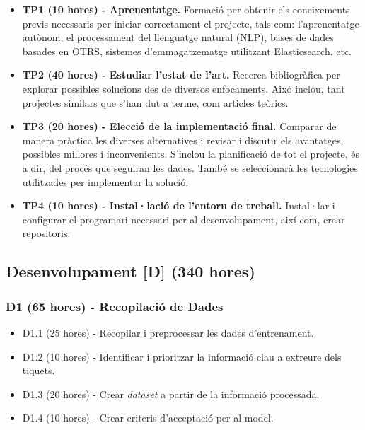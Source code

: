 \begin{itemize}
    \item \textbf{TP1 (10 hores) - Aprenentatge.}
        Formació per obtenir els coneixements previs necessaris per iniciar correctament el projecte, tals com: l'aprenentatge autònom, el processament del llenguatge natural (NLP), bases de dades basades en OTRS, sistemes d'emmagatzematge utilitzant Elasticsearch, etc.
    
    \item \textbf{TP2 (40 hores) - Estudiar l'estat de l'art.}
        Recerca bibliogràfica per explorar possibles solucions des de diversos enfocaments. Això inclou, tant projectes similars que s'han dut a terme, com articles teòrics.
    
    \item \textbf{TP3 (20 hores) - Elecció de la implementació final.}
        Comparar de manera pràctica les diverses alternatives i revisar i discutir els avantatges, possibles millores i inconvenients. S'inclou la planificació de tot el projecte, és a dir, del procés que seguiran les dades. També se seleccionarà les tecnologies utilitzades per implementar la solució.
        
    \item \textbf{TP4 (10 hores) - Instal·lació de l'entorn de treball.}
        Instal·lar i configurar el programari necessari per al desenvolupament, així com, crear repositoris.
\end{itemize}


\subsection{Desenvolupament [D] (340 hores)}

\subsubsection{D1 (65 hores) - Recopilació de Dades}
\begin{itemize}
    \item D1.1 (25 hores) - Recopilar i preprocessar les dades d'entrenament.
    \item D1.2 (10 hores) - Identificar i prioritzar la informació clau a extreure dels tiquets.
    \item D1.3 (20 hores) - Crear \textit{dataset} a partir de la informació processada.
    \item D1.4 (10 hores) - Crear criteris d'acceptació per al model.
\end{itemize}

